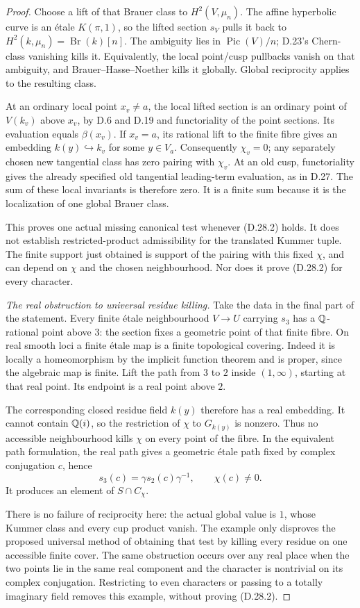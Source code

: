 \begin{proof}
Choose a lift of that Brauer class to $H^2(V,\mu_n)$. The affine
hyperbolic curve is an \'etale $K(\pi,1)$, so the lifted section $s_V$
pulls it back to $H^2(k,\mu_n)=\operatorname{Br}(k)[n]$.
The ambiguity lies in $\operatorname{Pic}(V)/n$; D.23's Chern-class
vanishing kills it. Equivalently, the local point/cusp pullbacks
vanish on that ambiguity, and Brauer--Hasse--Noether kills it globally.
Global reciprocity applies to the resulting class.

At an ordinary local point $x_v\ne a$, the local lifted section is
an ordinary point of $V(k_v)$ above $x_v$, by D.6 and D.19 and
functoriality of the point sections. Its evaluation equals
$\beta(x_v)$. If $x_v=a$, its rational lift to the finite fibre gives
an embedding $k(y)\hookrightarrow k_v$ for some $y\in V_a$.
Consequently $\chi_v=0$; any separately chosen new tangential class
has zero pairing with $\chi_v$. At an old cusp, functoriality gives
the already specified old tangential leading-term evaluation, as in
D.27. The sum of these local invariants is therefore zero. It is a
finite sum because it is the localization of one global Brauer class.

This proves one actual missing canonical test whenever (D.28.2)
holds. It does not establish restricted-product admissibility for
the translated Kummer tuple. The finite support just obtained is
support of the pairing with this fixed $\chi$, and can depend on
$\chi$ and the chosen neighbourhood. Nor does it prove (D.28.2)
for every character.

\emph{The real obstruction to universal residue killing.}
Take the data in the final part of the statement. Every finite
\'etale neighbourhood $V\to U$ carrying $s_3$ has a $\mathbb Q$-rational
point above $3$: the section fixes a geometric point of that finite
fibre. On real smooth loci a finite \'etale map is a finite
topological covering. Indeed it is locally a homeomorphism by the
implicit function theorem and is proper, since the algebraic map
is finite. Lift the path from $3$ to $2$ inside $(1,\infty)$,
starting at that real point. Its endpoint is a real point above $2$.

The corresponding closed residue field $k(y)$ therefore has a real
embedding. It cannot contain $\mathbb Q(i)$, so the restriction of $\chi$
to $G_{k(y)}$ is nonzero. Thus no accessible neighbourhood kills
$\chi$ on every point of the fibre. In the equivalent path formulation,
the real path gives a geometric \'etale path fixed by complex
conjugation $c$, hence
\[
       s_3(c)=\gamma s_2(c)\gamma^{-1},\qquad\chi(c)\ne0.
\]
It produces an element of $S\cap C_\chi$.

There is no failure of reciprocity here: the actual global value is
$1$, whose Kummer class and every cup product vanish. The example
only disproves the proposed universal method of obtaining that test
by killing every residue on one accessible finite cover. The same
obstruction occurs over any real place when the two points lie in
the same real component and the character is nontrivial on its
complex conjugation. Restricting to even characters or passing to
a totally imaginary field removes this example, without proving
(D.28.2).
\end{proof}

